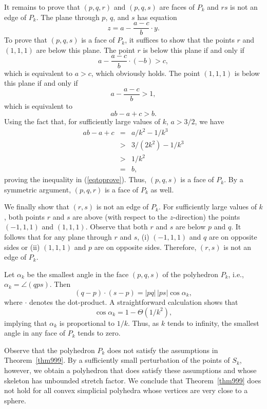 \documentclass[12pt]{article}
\begin{document}
It remains to prove that $(p,q,r)$ and $(p,q,s)$ are faces of $P_k$ and  
$rs$ is not an edge of $P_k$. The plane through $p$, $q$, and $s$ has 
equation
\[ z = a - \frac{a-c}{b} \cdot y . 
\]
To prove that $(p,q,s)$ is a face of $P_k$, it suffices to show that the 
points $r$ and $(1,1,1)$ are below this plane. The point $r$ is below 
this plane if and only if 
\[ a - \frac{a-c}{b} \cdot (-b) > c , 
\]
which is equivalent to $a>c$, which obviously holds. The point $(1,1,1)$ 
is below this plane if and only if 
\[ a - \frac{a-c}{b} > 1 ,
\]
which is equivalent to
\begin{equation}  \label{eqtoprove} 
 ab -a + c > b . 
\end{equation}
Using the fact that, for sufficiently large values of $k$, $a > 3/2$,
we have
\begin{eqnarray*} 
  ab-a+c & = & a/k^2 - 1/k^3 \\ 
         & > & 3/(2k^2) - 1/k^3 \\ 
         & > & 1/k^2 \\ 
         & = & b ,  
\end{eqnarray*}
proving the inequality in (\ref{eqtoprove}). Thus, $(p,q,s)$ is a face 
of $P_k$. By a symmetric argument, $(p,q,r)$ is a face of $P_k$ as well. 

We finally show that $(r,s)$ is not an edge of $P_k$. For sufficiently 
large values of $k$, both points $r$ and $s$ are above (with respect to 
the $z$-direction) the points $(-1,1,1)$ and $(1,1,1)$.
Observe that both $r$ and $s$ are below $p$ and $q$.
It follows that for any plane through $r$ and $s$, (i) $(-1,1,1)$ and
$q$ are on opposite sides or (ii) $(1,1,1)$ and $p$ are on opposite sides.
Therefore, $(r,s)$ is not an edge of $P_k$.

Let $\alpha_k$ be the smallest angle in the face $(p,q,s)$ of the 
polyhedron $P_k$, i.e., $\alpha_k = \angle(qps)$. Then 
\[ (q-p) \cdot (s-p) = |pq| \, |ps| \cos \alpha_k , 
\] 
where $\cdot$ denotes the dot-product. A straightforward calculation 
shows that 
\[ \cos \alpha_k = 1 - \Theta(1/k^2) , 
\]
implying that $\alpha_k$ is proportional to $1/k$. Thus, as $k$ tends to 
infinity, the smallest angle in any face of $P_k$ tends to zero.  

Observe that the polyhedron $P_k$ does not satisfy the assumptions in 
Theorem~\ref{thm999}. By a sufficiently small perturbation of the points 
of $S_k$, however, we obtain a polyhedron that does satisfy these 
assumptions and whose skeleton has unbounded stretch factor. We 
conclude that Theorem~\ref{thm999} does not hold for all convex 
simplicial polyhedra whose vertices are very close to a sphere. 
\end{document}
